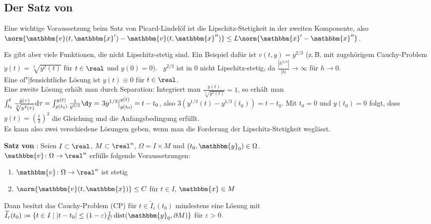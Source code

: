 \pagebreak

\subsection{%
    Der Satz von %
}

Eine wichtige Voraussetzung beim Satz von Picard-Lindelöf ist die
Lipschitz-Stetigkeit in der zweiten Komponente, also
$\norm{\mathbbm{v}(t, \mathbbm{x}') - \mathbbm{v}(t, \mathbbm{x}'')} \le
L\norm{\mathbbm{x}' - \mathbbm{x}''}$.

Es gibt aber viele Funktionen, die nicht Lipschitz-stetig sind.
Ein Beispiel dafür ist $v(t, y) = y^{2/3}$
(z.\,B. mit zugehörigem Cauchy-Problem
$\dot{y}(t) = \sqrt[3]{y^2(t)}$ für $t \in \real$ und $y(0) = 0$). \
$y^{2/3}$ ist in $0$ nicht Lipschitz-stetig, da
$\frac{|h^{2/3}|}{|h|} \to \infty$ für $h \to 0$. \\
Eine of"|fensichtliche Lösung ist $y(t) \equiv 0$ für $t \in \real$. \\
Eine zweite Lösung erhält man durch Separation:
Integriert man $\frac{\dot{y}(t)}{\sqrt[3]{y^2(t)}} = 1$, so erhält man
$\int_{t_0}^t \frac{\dot{y}(\tau)}{\sqrt[3]{y^2(\tau)}} \d\tau =
\int_{y(t_0)}^{y(t)} \frac{1}{y^{2/3}} \dy =
\left.3y^{1/3}\right|_{y(t_0)}^{y(t)} = t - t_0$,
also $3(y^{1/3}(t) - y^{1/3}(t_0)) = t - t_0$.
Mit $t_0 = 0$ und $y(t_0) = 0$ folgt, dass
$y(t) = \left(\frac{t}{3}\right)^3$ die Gleichung und die Anfangsbedingung
erfüllt. \\
Es kann also zwei verschiedene Lösungen geben, wenn man die Forderung der
Lipschitz-Stetig\-keit weglässt.

\linie

\textbf{Satz von }:
Seien $I \subset \real$, $M \subset \real^n$, $\Omega = I \times M$
und $(t_0, \mathbbm{y}_0) \in \Omega$. \\
$\mathbbm{v}\colon \Omega \rightarrow \real^n$ erfülle folgende
Voraussetzungen:
\begin{enumerate}
    \item
    $\mathbbm{v}\colon \Omega \rightarrow \real^n$ ist stetig

    \item
    $\norm{\mathbbm{v}(t, \mathbbm{x})} \le C$ für
    $t \in I$, $\mathbbm{x} \in M$
\end{enumerate}
Dann besitzt das Cauchy-Problem (CP) für $t \in \widetilde{I}_\varepsilon(t_0)$
mindestens eine Lösung mit \\
$\widetilde{I}_\varepsilon(t_0) := \{t \in I \;|\; |t - t_0| \le
(1 - \varepsilon) \frac{1}{C} \dist(\mathbbm{y}_0, \partial M)\}$
für $\varepsilon > 0$.


